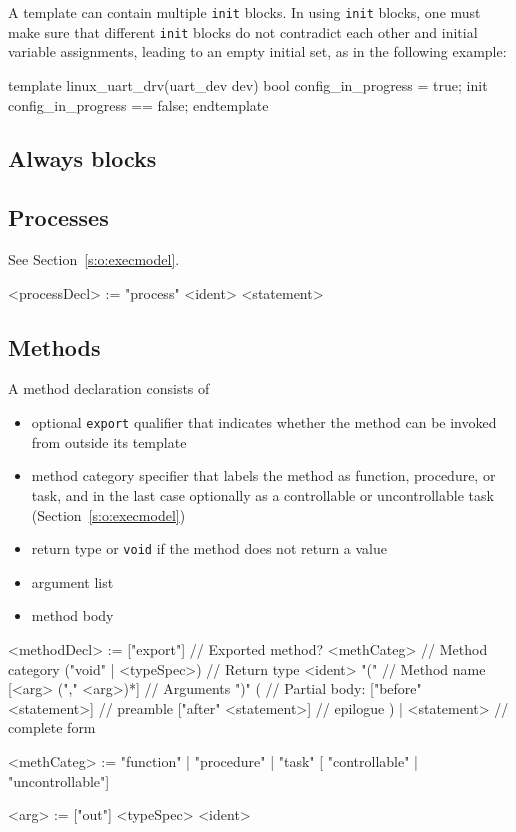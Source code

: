 \documentclass{report}
\newcommand{\src}[1]{\texttt{#1}}
\begin{document}
A template can contain multiple \src{init} blocks.  In using 
\src{init} blocks, one must make sure that different \src{init} 
blocks do not contradict each other and initial variable 
assignments, leading to an empty initial set, as in the following 
example:
\begin{tsllisting}{}
template linux_uart_drv(uart_dev dev)
    bool config_in_progress = true;
    init config_in_progress == false;
endtemplate
\end{tsllisting}

\subsection{Always blocks}

\subsection{Processes}

See Section~\ref{s:o:execmodel}.

\begin{bnflisting}{}
<processDecl> := "process" <ident> <statement>
\end{bnflisting}

\subsection{Methods}

A method declaration consists of
\begin{itemize}
    \item optional \src{export} qualifier that indicates whether 
        the method can be invoked from outside its template
    \item method category specifier that labels the method as 
        function, procedure, or task, and in the last case 
        optionally as a controllable or uncontrollable task 
        (Section~\ref{s:o:execmodel})
    \item return type or \src{void} if the method does not return 
        a value
    \item argument list
    \item method body
\end{itemize}

\begin{bnflisting}{}
<methodDecl> := ["export"]               // Exported method?
                <methCateg>              // Method category
                ("void" | <typeSpec>)       // Return type
                <ident> "("                 // Method name
                    [<arg> ("," <arg>)*]    // Arguments
                ")"
                    (                       // Partial body:
                     ["before" <statement>] // preamble
                     ["after" <statement>]  // epilogue
                    ) |
                    <statement>             // complete form

<methCateg> := "function"
             | "procedure"
             | "task" [ "controllable" 
                      | "uncontrollable"]

<arg> := ["out"] <typeSpec> <ident>
\end{bnflisting}
\end{document}
